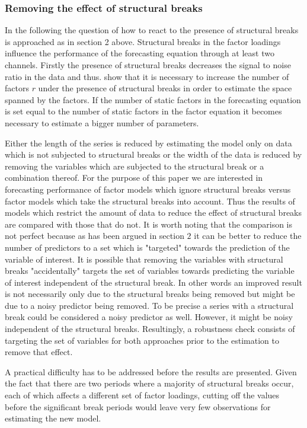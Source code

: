 \documentclass[12pt]{article}
\begin{document}
\subsubsection{Removing the effect of structural breaks}

In the following the question of how to react to the presence of structural breaks is approached as in section 2 above. Structural breaks in the factor loadings influence the performance of the forecasting equation through at least two channels. Firstly the presence of structural breaks decreases the signal to noise ratio in the data and thus. \citet{breitung2011testing} show that it is necessary to increase the number of factors $r$ under the presence of structural breaks in order to estimate the space spanned by the factors. If the number of static factors in the forecasting equation is set equal to the number of static factors in the factor equation it becomes necessary to estimate a bigger number of parameters. 


Either the length of the series is reduced by estimating the model only on data which is not subjected to structural breaks or the width of the data is reduced by removing the variables which are subjected to the structural break or a combination thereof. For the purpose of this paper we are interested in forecasting performance of factor models which ignore structural breaks versus factor models which take the structural breaks into account. Thus the results of models which restrict the amount of data to reduce the effect of structural breaks are compared with those that do not. It is worth noting that the comparison is not perfect because as has been argued in section $2$ it can be better to reduce the number of predictors to a set which is "targeted" towards the prediction of the variable of interest. It is possible that removing the variables with structural breaks "accidentally" targets the set of variables towards predicting the variable of interest independent of the structural break. In other words an improved result is not necessarily only due to the structural breaks being removed but might be due to a noisy predictor being removed. To be precise a series with a structural break could be considered a noisy predictor as well. However, it might be noisy independent of the structural breaks.
Resultingly, a robustness check consists of targeting the set of variables for both approaches prior to the estimation to remove that effect.

A practical difficulty has to be addressed before the results are presented. Given the fact that there are two periods where a majority of structural breaks occur, each of which affects a different set of factor loadings, cutting off the values before the significant break periods would leave very few observations for estimating the new model.
\end{document}
